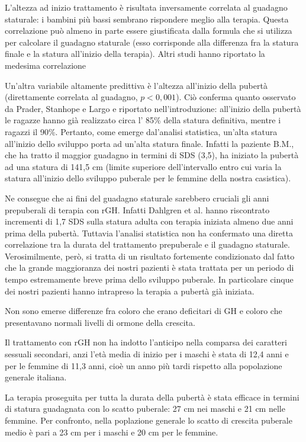 L'altezza ad inizio trattamento è risultata inversamente correlata al guadagno staturale: i bambini più bassi sembrano rispondere meglio alla terapia. Questa correlazione può almeno in parte essere giustificata dalla formula che si utilizza per calcolare il guadagno staturale (esso corrisponde alla differenza fra la statura finale e la statura all'inizio della terapia). Altri studi hanno riportato la medesima correlazione\cite{de2005growth} \cite{de2000growth}

Un'altra variabile altamente predittiva è l'altezza all'inizio della pubertà (direttamente correlata al guadagno, $p < 0,001$). Ciò conferma quanto osservato da Prader, Stanhope e Largo  e riportato nell'introduzione: 
 all'inizio della pubertà le ragazze hanno già realizzato circa l' 85\% della statura definitiva, mentre i ragazzi il 90\%. Pertanto, come emerge dal'analisi statistica, un'alta statura all'inizio dello sviluppo porta ad un'alta statura finale. Infatti la paziente B.M., che ha tratto il maggior guadagno in termini di SDS (3,5), ha iniziato la pubertà ad una statura di 141,5 cm (limite superiore dell'intervallo entro cui varia la statura all'inizio dello sviluppo puberale per le femmine della nostra casistica). 

Ne consegue che ai fini del guadagno staturale sarebbero cruciali gli anni prepuberali di terapia con rGH. Infatti Dahlgren et al. hanno riscontrato incrementi di 1,7 SDS sulla statura adulta con terapia iniziata almeno due anni prima della pubertà\cite{dahlgren2005final}. Tuttavia l'analisi statistica non ha confermato una diretta correlazione tra la durata del trattamento prepuberale e il guadagno staturale. Verosimilmente, però, si tratta di un risultato fortemente condizionato dal fatto che la grande maggioranza dei nostri pazienti è stata trattata per un periodo di tempo estremamente breve prima dello sviluppo puberale. In particolare cinque dei nostri pazienti hanno intrapreso la terapia a pubertà già iniziata.

Non sono emerse differenze fra coloro che erano deficitari di GH  e coloro che presentavano normali livelli di ormone della crescita.

Il trattamento con rGH non ha indotto l'anticipo nella comparsa dei caratteri sessuali secondari, anzi l'età media di inizio per i maschi è stata di 12,4 anni e per le femmine di 11,3 anni, cioè un anno più tardi rispetto alla popolazione generale italiana\cite{benso1989distribution}.

La terapia proseguita per tutta la durata della pubertà è stata efficace in termini di statura guadagnata con lo scatto puberale: 27 cm nei maschi e 21 cm nelle femmine. Per confronto, nella poplazione generale lo scatto di crescita puberale medio è pari a 23 cm per i maschi e 20 cm per le femmine\cite{tanner1990foetus}. 

